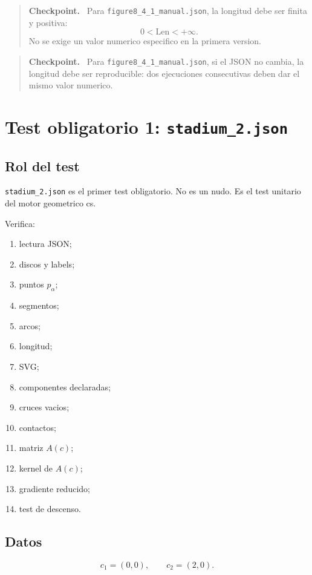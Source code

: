 \documentclass[11pt,letterpaper]{amsart}
\newcommand{\Len}{\mathrm{Len}}
\newenvironment{checkpoint}
{\par\medskip\noindent\begin{quote}\textbf{Checkpoint.}\ }
{\end{quote}\par\medskip}
\begin{document}
\begin{checkpoint}
Para \texttt{figure8\_4\_1\_manual.json}, la longitud debe ser finita y positiva:
\[
0<\Len<+\infty.
\]
No se exige un valor numerico especifico en la primera version.
\end{checkpoint}

\begin{checkpoint}
Para \texttt{figure8\_4\_1\_manual.json}, si el JSON no cambia, la longitud debe
ser reproducible: dos ejecuciones consecutivas deben dar el mismo valor
numerico.
\end{checkpoint}

\section{Test obligatorio 1: \texttt{stadium\_2.json}}

\subsection{Rol del test}

\texttt{stadium\_2.json} es el primer test obligatorio. No es un nudo. Es el
test unitario del motor geometrico cs.

Verifica:

\begin{enumerate}[label=\textbf{\arabic*.}]
\item lectura JSON;
\item discos y labels;
\item puntos \(p_\alpha\);
\item segmentos;
\item arcos;
\item longitud;
\item SVG;
\item componentes declaradas;
\item cruces vacios;
\item contactos;
\item matriz \(A(c)\);
\item kernel de \(A(c)\);
\item gradiente reducido;
\item test de descenso.
\end{enumerate}

\subsection{Datos}

\[
c_1=(0,0),
\qquad
c_2=(2,0).
\]
\end{document}
